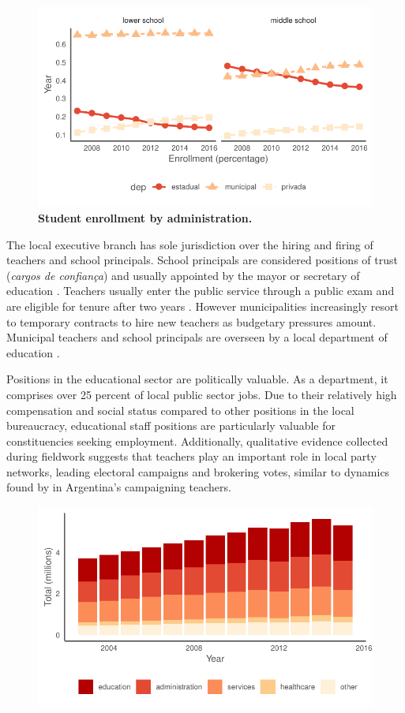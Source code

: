 \begin{figure}[h]
    \centering
    \includegraphics[width=0.6\linewidth]{chapters/chapter_1/plots/descriptive_enrollment.pdf}
    \caption{\textbf{Student enrollment by administration.}}
    \label{fig:enroll}
\end{figure}

The local executive branch has sole jurisdiction over the hiring and firing of teachers and school principals. School principals are considered positions of trust (\textit{cargos de confiança}) and usually appointed by the mayor or secretary of education \citet{brollo_victor_2017}. Teachers usually enter the public service through a public exam and are eligible for tenure after two years \citet{gatti_formacao_2010}. However municipalities increasingly resort to temporary contracts to hire new teachers as budgetary pressures amount. Municipal teachers and school principals are overseen by a local department of education \citep{militao_educacao_2014}.

Positions in the educational sector are politically valuable. As a department, it comprises over 25 percent of local public sector jobs. Due to their relatively high compensation and social status compared to other positions in the local bureaucracy, educational staff positions are particularly valuable for constituencies seeking employment. Additionally, qualitative evidence collected during fieldwork suggests that teachers play an important role in local party networks, leading electoral campaigns and brokering votes, similar to dynamics found by \citet{oliveros_making_2016} in Argentina's campaigning teachers.

\begin{figure}[h]
    \centering
    \includegraphics[width=0.6\linewidth]{chapters/chapter_1/plots/descriptive_staff_breakdown}
\end{figure}


